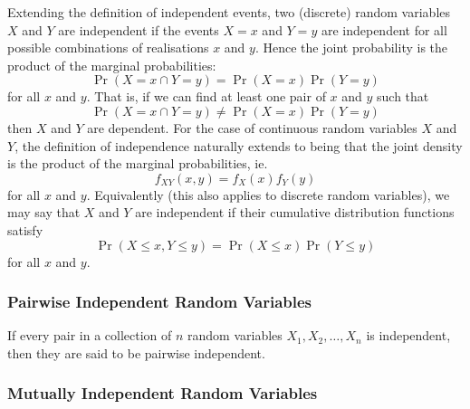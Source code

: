 \documentclass[11pt]{report} %
\begin{document}
Extending the definition of independent events, two (discrete) random variables $X$ and $Y$ are independent if the events $X = x$ and $Y = y$ are independent for all possible combinations of realisations $x$ and $y$. Hence the joint probability is the product of the marginal probabilities:
\begin{equation}
\operatorname{Pr}\left(X = x \cap Y = y\right) = \operatorname{Pr}\left(X = x\right)\operatorname{Pr}\left(Y = y\right)
\end{equation}
for all $x$ and $y$. That is, if we can find at least one pair of $x$ and $y$ such that
\begin{equation}
\operatorname{Pr}\left(X = x \cap Y = y\right) \neq \operatorname{Pr}\left(X = x\right)\operatorname{Pr}\left(Y = y\right)
\end{equation}
then $X$ and $Y$ are dependent. For the case of continuous random variables $X$ and $Y$, the definition of independence naturally extends to being that the joint density is the product of the marginal probabilities, ie.
\begin{equation}
f_{XY}\left(x, y\right) = f_{X}\left(x\right)f_{Y}\left(y\right)
\end{equation}
for all $x$ and $y$. Equivalently (this also applies to discrete random variables), we may say that $X$ and $Y$ are independent if their cumulative distribution functions satisfy
\begin{equation}
\operatorname{Pr}\left(X \leq x, Y \leq y\right) = \operatorname{Pr}\left(X \leq x\right)\operatorname{Pr}\left(Y \leq y\right)
\end{equation}
for all $x$ and $y$.

\subsubsection{Pairwise Independent Random Variables}

If every pair in a collection of $n$ random variables $X_{1}, X_{2}, \dots, X_{n}$ is independent, then they are said to be pairwise independent.

\subsubsection{Mutually Independent Random Variables}
\end{document}
